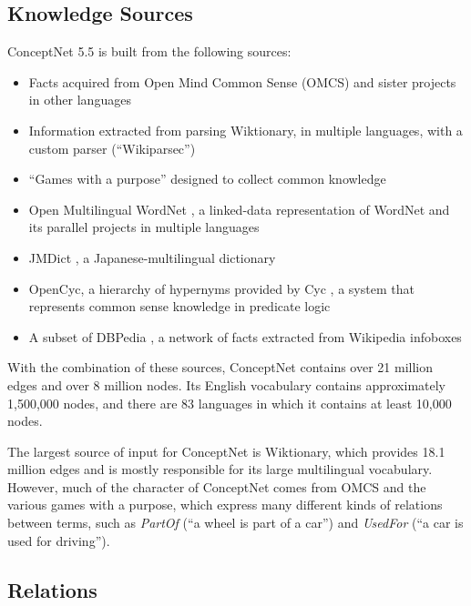 \documentclass[letterpaper]{article}
\begin{document}
\subsection{Knowledge Sources}\label{knowledge-sources}

ConceptNet 5.5 is built from the following sources:

\begin{itemize}
\item
  Facts acquired from Open Mind Common Sense (OMCS) \cite{singh2002omcs}
  and sister projects in other languages \cite{anacleto2006portuguese}
\item
  Information extracted from parsing Wiktionary, in multiple languages,
  with a custom parser (``Wikiparsec'')
\item
  ``Games with a purpose'' designed to collect common knowledge
  \cite{vonahn2006verbosity} \cite{nakahara2011nadya} \cite{kuo2009petgame}
\item
  Open Multilingual WordNet \cite{bond2013linking}, a linked-data
  representation of WordNet \cite{miller1998wordnet} and its parallel
  projects in multiple languages
\item
  JMDict \cite{breen2004jmdict}, a Japanese-multilingual dictionary
\item
  OpenCyc, a hierarchy of hypernyms provided by
  Cyc \cite{lenat1989cyc}, a system that represents common sense knowledge in predicate logic
\item
  A subset of DBPedia \cite{auer2007dbpedia}, a network of facts
  extracted from Wikipedia infoboxes
\end{itemize}

With the combination of these sources, ConceptNet contains over 21
million edges and over 8 million nodes. Its English vocabulary contains
approximately 1,500,000 nodes, and there are 83 languages in which it
contains at least 10,000 nodes.

The largest source of input for ConceptNet is Wiktionary, which provides
18.1 million edges and is mostly responsible for its large multilingual
vocabulary. However, much of the character of ConceptNet comes from OMCS
and the various games with a purpose, which express many different kinds
of relations between terms, such as \emph{PartOf} (``a wheel is part of
a car'') and \emph{UsedFor} (``a car is used for driving'').


\subsection{Relations}\label{relations}
\end{document}

